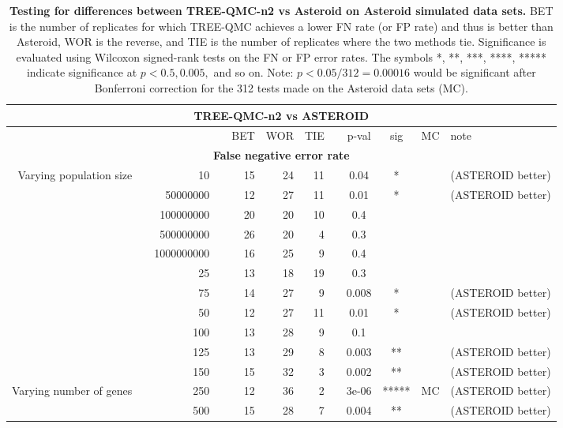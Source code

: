 \begin{table}[!h]
\caption[Statistical testing for TREE-QMC-n2 vs Asteroid on Asteroid data]{
\textbf{Testing for differences between TREE-QMC-n2 vs Asteroid on Asteroid simulated data sets.}
BET is the number of replicates for which TREE-QMC achieves a lower FN rate (or FP rate) and thus is better than Asteroid, WOR is the reverse, and TIE is the number of replicates where the two methods tie.
Significance is evaluated using Wilcoxon signed-rank tests on the FN or FP error rates.
The symbols *, **, ***, ****, ***** indicate significance at $p < 0.5, 0.005,$ and so on.
Note: $p < 0.05 / 312 = 0.00016$ would be significant after Bonferroni correction for the 312 tests made on the Asteroid data sets (MC).}
\centering
\scriptsize
\begin{tabular}{r r r l r r r l c c c l}
\toprule 
\multicolumn{12}{c}{\textbf{TREE-QMC-n2 vs ASTEROID}} \\
\midrule
\multirow{ 1}{2cm}{}
& & & & BET & WOR & TIE & & p-val & sig & MC & note \\
\midrule
\multicolumn{12}{c}{\textbf{False negative error rate}} \\
\midrule
\multirow{ 6}{2cm}{Varying population size}
& & 10 & & 15 & 24 & 11 & & 0.04 & * &  & (ASTEROID better) \\
& & 50000000 & & 12 & 27 & 11 & & 0.01 & * &  & (ASTEROID better) \\
& & 100000000 & & 20 & 20 & 10 & & 0.4 &  &  &  \\
& & 500000000 & & 26 & 20 & 4 & & 0.3 &  &  &  \\
& & 1000000000 & & 16 & 25 & 9 & & 0.4 &  &  &  \\
\midrule
\multirow{ 6}{2cm}{Varying number of taxa}
& & 25 & & 13 & 18 & 19 & & 0.3 &  &  &  \\
& & 75 & & 14 & 27 & 9 & & 0.008 & * &  & (ASTEROID better) \\
& & 50 & & 12 & 27 & 11 & & 0.01 & * &  & (ASTEROID better) \\
& & 100 & & 13 & 28 & 9 & & 0.1 &  &  &  \\
& & 125 & & 13 & 29 & 8 & & 0.003 & ** &  & (ASTEROID better) \\
& & 150 & & 15 & 32 & 3 & & 0.002 & ** &  & (ASTEROID better) \\
\midrule
\multirow{ 4}{2cm}{Varying number of genes}
& & 250 & & 12 & 36 & 2 & & 3e-06 & ***** & MC & (ASTEROID better) \\
& & 500 & & 15 & 28 & 7 & & 0.004 & ** &  & (ASTEROID better) \\

\end{tabular}
\end{table}
